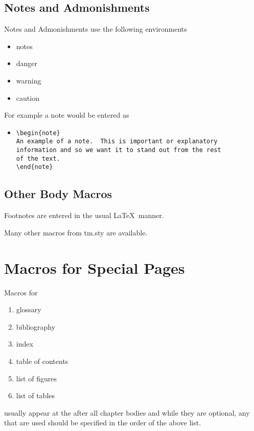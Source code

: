 \subsection{Notes and Admonishments}
Notes and Admonishments use the following environments
  \begin{itemize}
    \item notes
    \item danger
    \item warning
    \item caution
  \end{itemize}
For example a note would be entered as
  \begin{itemize}
    \item[]\verb|\begin{note}|\\
          \verb|An example of a note.  This is important or explanatory|\\
          \verb|information and so we want it to stand out from the rest|\\
          \verb|of the text.|\\
          \verb|\end{note}|
  \end{itemize}
\subsection{Other Body Macros}
Footnotes are entered in the usual \LaTeX\ manner.

Many other macros from tm.sty are available.
\section{Macros for Special Pages}
Macros for 
\begin{enumerate}
  \item glossary
  \item bibliography
  \item index
  \item table of contents
  \item list of figures
  \item list of tables
\end{enumerate}
usually appear at the after all chapter bodies and while they are
optional, any that are used should be specified in
the order of the above list.

